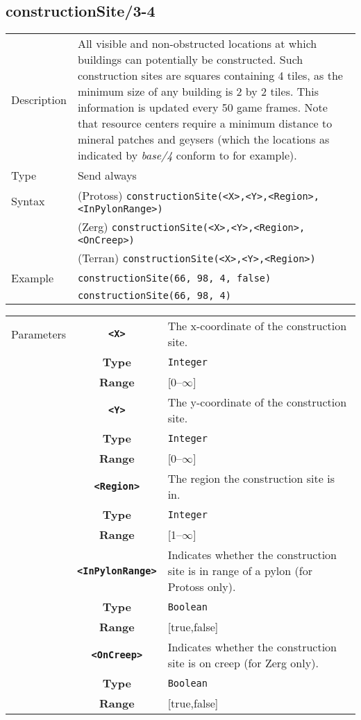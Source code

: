 \subsection{constructionSite/3-4}
\begin{tabularx}{\textwidth}{lX}
 Description & All visible and non-obstructed locations at which buildings can potentially be constructed. Such construction sites are squares containing 4 tiles, as the minimum size of any building is 2 by 2 tiles. This information is updated every 50 game frames. Note that resource centers require a minimum distance to mineral patches and geysers (which the locations as indicated by \textit{base/4} conform to for example). \\
 Type & Send always \\
 Syntax & (Protoss) \verb|constructionSite(<X>,<Y>,<Region>,<InPylonRange>)| \\
        & (Zerg) \verb|constructionSite(<X>,<Y>,<Region>,<OnCreep>)|\\
        & (Terran) \verb|constructionSite(<X>,<Y>,<Region>)| \\
 Example & \verb|constructionSite(66, 98, 4, false)| \\
         & \verb|constructionSite(66, 98, 4)| \\
 \end{tabularx}
 \begin{tabularx}{\textwidth}{l | c | p{8cm}|}
 \cline{2-3}
 Parameters & \textbf{\verb|<X>|} & The x-coordinate of the construction site.\\
            & \textbf{Type} & \verb|Integer| \\
            & \textbf{Range} & [0--$\infty$] \\
            \cline{2-3}
            & \textbf{\verb|<Y>|} & The y-coordinate of the construction site.\\
            & \textbf{Type} & \verb|Integer| \\
            & \textbf{Range} & [0--$\infty$] \\
            \cline{2-3}
            & \textbf{\verb|<Region>|} & The region the construction site is in.\\
            & \textbf{Type} & \verb|Integer| \\
            & \textbf{Range} & [1--$\infty$] \\
            \cline{2-3}
            & \textbf{\verb|<InPylonRange>|} & Indicates whether the construction site is in range of a pylon (for Protoss only). \\
            & \textbf{Type} & \verb|Boolean| \\
            & \textbf{Range} & [true,false] \\
            \cline{2-3}
            & \textbf{\verb|<OnCreep>|} & Indicates whether the construction site is on creep (for Zerg only). \\
            & \textbf{Type} & \verb|Boolean| \\
            & \textbf{Range} & [true,false] \\
            \cline{2-3}
\end{tabularx}


